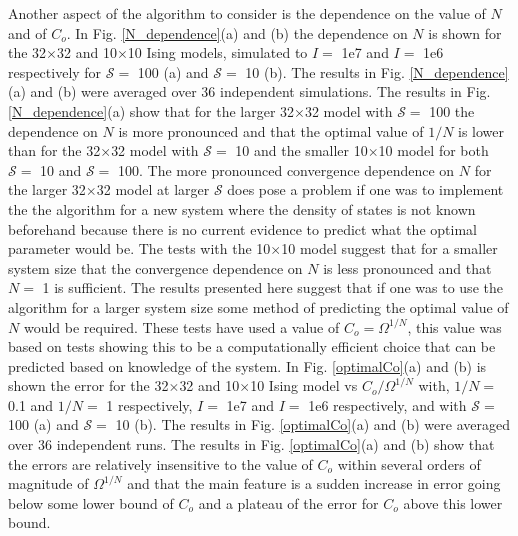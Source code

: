 \documentclass[aps,pre,reprint,superscriptaddress,showkeys]{revtex4-1}
\begin{document}
Another aspect of the algorithm to consider is the dependence on the value of $N$ and of $C_{o}$. In Fig. \ref{N_dependence}(a) and (b) the dependence on $N$ is shown for  the 32$\times$32  and  10$\times$10 Ising models, simulated to $I=$ 1e7 and $I=$ 1e6 respectively for $\mathcal{S}=$ 100  (a) and $\mathcal{S}=$ 10  (b). The results in Fig. \ref{N_dependence}(a) and (b) were averaged over 36 independent simulations. The results in Fig. \ref{N_dependence}(a) show that for the larger 32$\times$32 model with $\mathcal{S}=$ 100 the dependence on $N$ is more pronounced and that the optimal value of $1/N$ is lower than for the  32$\times$32 model with $\mathcal{S}=$ 10 and the  smaller 10$\times$10 model for both $\mathcal{S}=$ 10 and $\mathcal{S}=$ 100. The more pronounced convergence dependence on $N$ for the larger 32$\times$32 model at larger $\mathcal{S}$ does pose a problem if one was to implement the the algorithm for a new system where the density of states is not known beforehand because there is no current evidence to predict what the optimal parameter would be.  The tests with the 10$\times$10 model suggest that for a smaller system size that the convergence dependence on $N$ is less pronounced and that $N=$ 1 is sufficient. The results presented here suggest that if one was to use the algorithm for a larger system size some method of predicting the optimal value of $N$ would be required. These tests have used a value of $C_{o}=\Omega^{1/N}$, this value was based on tests showing this to be a computationally efficient choice that can be predicted based on knowledge of the system. In Fig. \ref{optimalCo}(a) and (b)  is shown the error for the 32$\times$32 and 10$\times$10   Ising model vs $C_{o}/\Omega^{1/N}$ with, $1/N=$ 0.1 and $1/N=$ 1 respectively, $I=$ 1e7 and $I=$ 1e6 respectively, and with $\mathcal{S}=$ 100  (a) and $\mathcal{S}=$ 10  (b). The results in Fig. \ref{optimalCo}(a) and (b) were averaged over 36 independent runs. The results in Fig. \ref{optimalCo}(a) and (b)  show that the errors are relatively insensitive to the value of $C_{o}$ within several orders of magnitude of $\Omega^{1/N}$ and that the main feature is a sudden increase in error going below some lower bound of $C_{o}$ and a plateau of the error for $C_{o}$ above this lower bound. 
\end{document}
